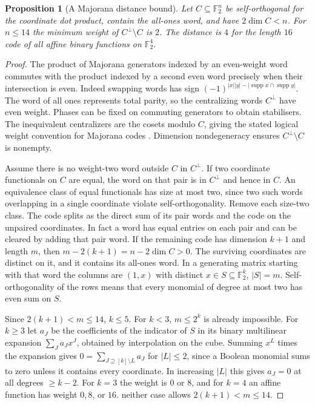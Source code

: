 \documentclass[aps,pra,onecolumn,superscriptaddress,nofootinbib,10pt]{revtex4-2}
\newtheorem{proposition}[theorem]{Proposition}
\theoremstyle{definition}
\theoremstyle{remark}
\begin{document}
\begin{proposition}[A Majorana distance bound]\label{ob:majorana}
Let \(C\subseteq\mathbb F_2^n\) be self-orthogonal for the coordinate
dot product, contain the all-ones word, and have \(2\dim C<n\).
For \(n\le14\) the minimum weight of \(C^\perp\setminus C\) is \(2\).
The distance is \(4\) for the length \(16\) code of all affine
binary functions on \(\mathbb F_2^4\).
\end{proposition}
\begin{proof}
The product of Majorana generators indexed by an even-weight word
commutes with the product indexed by a second even word precisely
when their intersection is even. Indeed swapping words has sign
\((-1)^{|x||y|-|\operatorname{supp}x\cap\operatorname{supp}y|}\).
The word of all ones represents total parity, so the centralizing
words \(C^\perp\) have even weight. Phases can be fixed on commuting
generators to obtain stabilisers. The inequivalent centralizers
are the cosets modulo \(C\), giving the stated logical weight
convention for Majorana codes \cite{obr:hastings,rf:Bravyi2010}. Dimension
nondegeneracy ensures \(C^\perp\setminus C\) is nonempty.

Assume there is no weight-two word outside \(C\) in \(C^\perp\).
If two coordinate functionals on \(C\) are equal, the word on that
pair is in \(C^\perp\) and hence in \(C\). An equivalence class of
equal functionals has size at most two, since two such words
overlapping in a single coordinate violate self-orthogonality.
Remove each size-two class. The code splits as the direct sum of
its pair words and the code on the unpaired coordinates. In fact a
word has equal entries on each pair and can be cleared by adding that
pair word. If the remaining code has dimension \(k+1\) and length
\(m\), then \(m-2(k+1)=n-2\dim C>0\). The surviving coordinates are
distinct on it, and it contains its all-ones word. In a generating
matrix starting with that word the columns are \((1,x)\) with
distinct \(x\in S\subseteq\mathbb F_2^k\), \(|S|=m\).
Self-orthogonality of the rows means that every monomial of degree
at most two has even sum on \(S\).

Since \(2(k+1)<m\le14\), \(k\le5\). For \(k<3\), \(m\le2^k\)
is already impossible. For \(k\ge3\) let \(a_J\) be the coefficients
of the indicator of \(S\) in its binary multilinear expansion
\(\sum_J a_J x^J\), obtained by interpolation on the cube.
Summing \(x^L\) times the expansion gives
\(0=\sum_{J\supseteq[k]\setminus L} a_J\) for \(|L|\le2\),
since a Boolean monomial sums to zero unless it contains every
coordinate. In increasing \(|L|\) this gives \(a_J=0\) at
all degrees \(\ge k-2\). For \(k=3\) the weight is \(0\) or \(8\),
and for \(k=4\) an affine function has weight \(0,8\), or \(16\).
neither case allows \(2(k+1)<m\le14\).


\end{proof}
\end{document}
